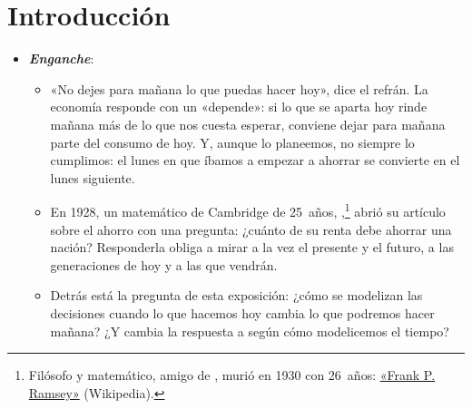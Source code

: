 \documentclass[11pt]{article}
\begin{document}
\tceetitulo

\section*{Introducción}

\begin{itemize}
\item \textbf{\emph{Enganche}}:
  \begin{itemize}
  \item «No dejes para mañana lo que puedas hacer hoy», dice el refrán. La economía responde con un «depende»: si lo que se aparta hoy rinde mañana más de lo que nos cuesta esperar, conviene dejar para mañana parte del consumo de hoy. Y, aunque lo planeemos, no siempre lo cumplimos: el lunes en que íbamos a empezar a ahorrar se convierte en el lunes siguiente.
  \item En 1928, un matemático de Cambridge de 25~años, ,\footnote{Filósofo y matemático, amigo de , murió en 1930 con 26~años: \href{https://es.wikipedia.org/wiki/Frank_P._Ramsey}{«Frank P. Ramsey»} (Wikipedia).} abrió su artículo sobre el ahorro con una pregunta: ¿cuánto de su renta debe ahorrar una nación?\nocite{Ramsey1928} Responderla obliga a mirar a la vez el presente y el futuro, a las generaciones de hoy y a las que vendrán.
  \item Detrás está la pregunta de esta exposición: ¿cómo se modelizan las decisiones cuando lo que hacemos hoy cambia lo que podremos hacer mañana? ¿Y cambia la respuesta a  según cómo modelicemos el tiempo?
  \end{itemize}


\end{itemize}
\end{document}
